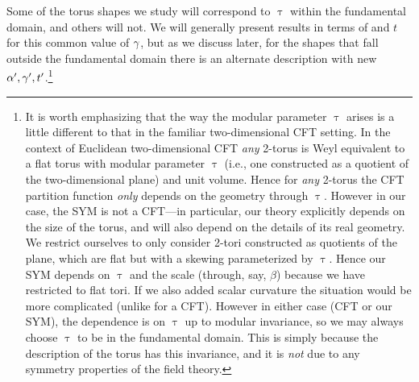 Some of the torus shapes we study will correspond to $\uptau$ within the fundamental domain, and others will not.
We will generally present results in terms of \al and $t$ for this common value of $\gamma$, but as we discuss later, for the shapes that fall outside the fundamental domain there is an alternate description with new $\alpha', \gamma', t'$.\footnote{It is worth emphasizing that the way the modular parameter $\uptau$ arises is a little different to that in the familiar two-dimensional CFT setting.  In the context of Euclidean two-dimensional CFT \emph{any} 2-torus is Weyl equivalent to a flat torus with modular parameter $\uptau$ (i.e., one constructed as a quotient of the two-dimensional plane) and unit volume.  Hence for \emph{any} 2-torus the CFT partition function \emph{only} depends on the geometry through $\uptau$.  However in our case, the SYM is not a CFT---in particular, our theory explicitly depends on the size of the torus, and will also depend on the details of its real geometry.  We restrict ourselves to only consider 2-tori constructed as quotients of the plane, which are flat but with a skewing parameterized by $\uptau$.  Hence our SYM depends on $\uptau$ and the scale (through, say, $\beta$) because we have restricted to flat tori.  If we also added scalar curvature the situation would be more complicated (unlike for a CFT).  However in either case (CFT or our SYM), the dependence is on $\uptau$ up to modular invariance, so we may always choose $\uptau$ to be in the fundamental domain.  This is simply because the description of the torus has this invariance, and it is \emph{not} due to any symmetry properties of the field theory.}

